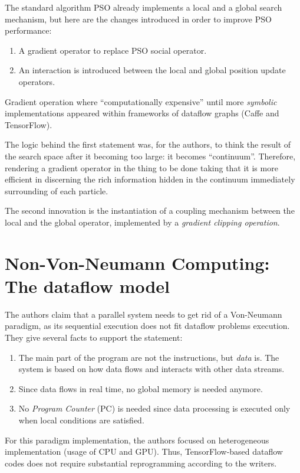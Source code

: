 \documentclass[10pt]{article}
\begin{document}
The standard algorithm PSO already implements a local and a global search
mechanism, but here are the changes introduced in order to improve PSO
performance:

\begin{enumerate}
 \item A gradient operator to replace PSO social operator.
 \item An interaction is introduced between the local and global position update
 operators.
\end{enumerate}

Gradient operation where ``computationally expensive'' until more
\emph{symbolic} implementations appeared within frameworks of dataflow graphs 
(Caffe and TensorFlow).

The logic behind the first statement was, for the authors, to think the result 
of the search space after it becoming too large: it becomes ``continuum''. 
Therefore, rendering a gradient operator in the thing to be done taking that it 
is more efficient in discerning the rich information hidden in the continuum
immediately surrounding of each particle.

The second innovation is the instantiation of a coupling mechanism between the
local and the global operator, implemented by a \emph{gradient clipping
operation}.

\section{Non-Von-Neumann Computing: The dataflow model}

The authors claim that a parallel system needs to get rid of a Von-Neumann
paradigm, as its sequential execution does not fit dataflow problems execution.
They give several facts to support the statement:

\begin{enumerate}
 \item The main part of the program are not the instructions, but \emph{data}
 is. The system is based on how data flows and interacts with other data
 streams.
 \item Since data flows in real time, no global memory is needed anymore.
 \item No \emph{Program Counter} (PC) is needed since data processing is
 executed only when local conditions are satisfied.
\end{enumerate}

For this paradigm implementation, the authors focused on heterogeneous
implementation (usage of CPU and GPU). Thus, TensorFlow-based dataflow codes
does not require substantial reprogramming according to the writers. 
\end{document}
